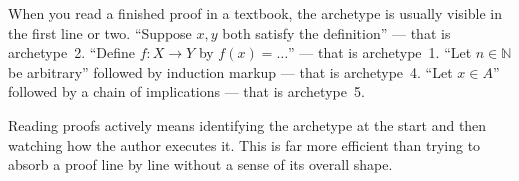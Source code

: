 \begin{remark}
When you read a finished proof in a textbook, the archetype is usually
visible in the first line or two. ``Suppose $x, y$ both satisfy the
definition'' --- that is archetype~2. ``Define $f : X \to Y$ by
$f(x) = \ldots$'' --- that is archetype~1. ``Let $n \in \mathbb{N}$ be
arbitrary'' followed by induction markup --- that is archetype~4.
``Let $x \in A$'' followed by a chain of implications --- that is
archetype~5.

Reading proofs actively means identifying the archetype at the start
and then watching how the author executes it. This is far more efficient
than trying to absorb a proof line by line without a sense of its
overall shape.
\end{remark}
